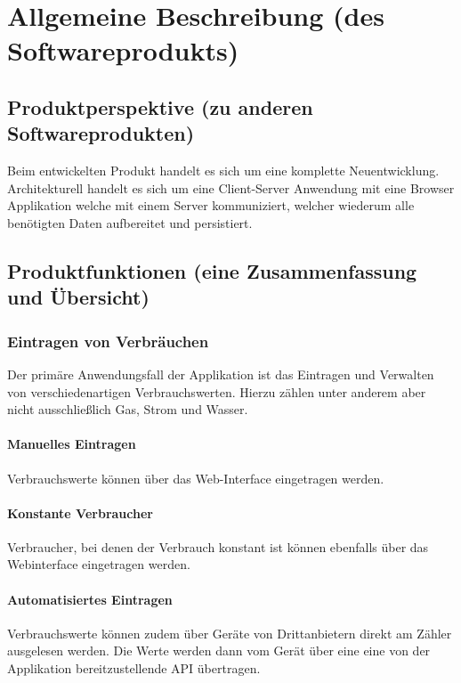 \section{Allgemeine Beschreibung (des Softwareprodukts)}


\subsection{Produktperspektive (zu anderen Softwareprodukten)}


Beim entwickelten Produkt handelt es sich um eine komplette Neuentwicklung. Architekturell handelt es sich um eine Client-Server Anwendung mit eine Browser Applikation welche mit einem Server kommuniziert, welcher wiederum alle benötigten Daten aufbereitet und persistiert.

\subsection{Produktfunktionen (eine Zusammenfassung und Übersicht)}

\subsubsection{Eintragen von Verbräuchen}

Der primäre Anwendungsfall der Applikation ist das Eintragen und Verwalten von verschiedenartigen Verbrauchswerten. Hierzu zählen unter anderem aber nicht ausschließlich Gas, Strom und Wasser.

\paragraph{Manuelles Eintragen}

Verbrauchswerte können über das Web-Interface eingetragen werden.

\paragraph{Konstante Verbraucher}
Verbraucher, bei denen der Verbrauch konstant ist können ebenfalls über das Webinterface eingetragen werden.

\paragraph{Automatisiertes Eintragen}
\label{autom_eintragen}

Verbrauchswerte können zudem über Geräte von Drittanbietern direkt am Zähler ausgelesen werden. Die Werte werden dann vom Gerät über eine eine von der Applikation bereitzustellende API übertragen.

